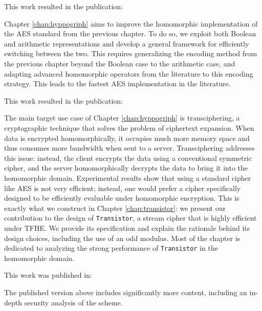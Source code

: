 This work resulted in the publication:

\begin{center}
\end{center}

Chapter \ref{chap:hyppogriph} aims to improve the homomorphic implementation of the AES standard from the previous chapter. To do so, we exploit both Boolean and arithmetic representations and develop a general framework for efficiently switching between the two. This requires generalizing the encoding method from the previous chapter beyond the Boolean case to the arithmetic case, and adapting advanced homomorphic operators from the literature to this encoding strategy. This leads to the fastest AES implementation in the literature.

This work resulted in the publication:

\begin{center}
\end{center}

The main target use case of Chapter \ref{chap:hyppogriph} is transciphering, a cryptographic technique that solves the problem of ciphertext expansion. When data is encrypted homomorphically, it occupies much more memory space and thus consumes more bandwidth when sent to a server. Transciphering addresses this issue: instead, the client encrypts the data using a conventional symmetric cipher, and the server homomorphically decrypts the data to bring it into the homomorphic domain. Experimental results show that using a standard cipher like AES is not very efficient; instead, one would prefer a cipher specifically designed to be efficiently evaluable under homomorphic encryption. This is exactly what we construct in Chapter \ref{chap:transistor}: we present our contribution to the design of \texttt{Transistor}, a stream cipher that is highly efficient under TFHE. We provide its specification and explain the rationale behind its design choices, including the use of an odd modulus. Most of the chapter is dedicated to analyzing the strong performance of \texttt{Transistor} in the homomorphic domain.

This work was published in:

\begin{center}
\end{center}

The published version above includes significantly more content, including an in-depth security analysis of the scheme.

